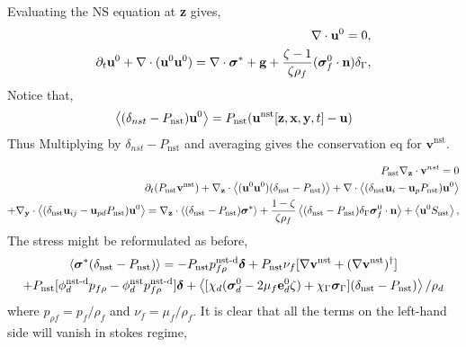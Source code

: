 Evaluating the NS equation at \textbf{z} gives, 
\begin{align}
    \mathbf{\nabla}\cdot \textbf{u}^0 = 0, \\
    \partial_t \textbf{u}^0
    + \mathbf{\nabla}\cdot (\textbf{u}^0\textbf{u}^0 )
    = 
    \mathbf{\nabla}\cdot \bm\sigma^*
    + \textbf{g}
    +\frac{\zeta-1}{\zeta\rho_f}(\bm\sigma_f^0\cdot \textbf{n})\delta_\Gamma,
\end{align}
Notice that, 
\begin{equation}
    \left<(\delta_{nst} - P_\text{nst}) \textbf{u}^0\right>
    = P_\text{nst}(\textbf{u}^\text{nst}[\textbf{z},\textbf{x},\textbf{y},t] - \textbf{u})
\end{equation}
Thus Multiplying by $\delta_{nst} - P_\text{nst}$ and averaging gives the conservation eq for $\textbf{v}^\text{nst}$. 


\begin{align}
    P_\text{nst} {\mathbf{\nabla}_\textbf{z}} \cdot \textbf{v}^{nst}
    = 0 
    \\
    \partial_t (P_\text{nst} \textbf{v}^\text{nst})
    + {\mathbf{\nabla}_\textbf{z}} \cdot\left<(\textbf{u}^0 \textbf{u}^0 )(\delta_\text{nst} - P_\text{nst})\right> 
    + \mathbf{\nabla}\cdot \left<(\delta_\text{nst} \textbf{u}_i  - \textbf{u}_p P_\text{nst})\textbf{u}^0 \right> \nonumber \\ 
    + {\mathbf{\nabla}_\textbf{y}}\cdot\left<(\delta_\text{nst} \textbf{u}_{ij}  - \textbf{u}_{pd} P_\text{nst})\textbf{u}^0 \right>
    =  
    {\mathbf{\nabla}_\textbf{z}}\cdot\left<(\delta_\text{nst} - P_\text{nst}) \bm\sigma^*\right>
    + \frac{1 - \zeta}{\zeta\rho_f}\left< (\delta_\text{nst} - P_\text{nst}) \delta_\Gamma \bm\sigma_f^0\cdot \textbf{n}\right>
    + \left<\textbf{u}^0 S_\text{nst}\right>,
\end{align}
The stress might be reformulated as before, 
\begin{multline}
    \left<\bm\sigma^* (\delta_\text{nst} - P_\text{nst})\right> 
    = 
    - P_\text{nst}  p_{f\rho}^\text{nst-d}\bm\delta
    + P_\text{nst} \nu_f [\mathbf{\nabla} \textbf{v}^\text{nst}+(\mathbf{\nabla} \textbf{v}^\text{nst})^\dagger] \\
    +P_\text{nst} [\phi_d^\text{nst-d} p_{f\rho}
    - \phi_d^\text{nst} p_{f\rho}^\text{nst-d}] \bm\delta
    + \left<[\chi_d (\bm\sigma_d^0 - 2 \mu_f \textbf{e}^0_d \zeta) + \chi_\Gamma \bm\sigma_\Gamma ]  (\delta_\text{nst} - P_\text{nst})\right> /\rho_d \nonumber
\end{multline}
where $p_{\rho f} = p_f/ \rho_f$ and $\nu_f = \mu_f/\rho_f$. 
It is clear that all the terms on the left-hand side will vanish in stokes regime,


